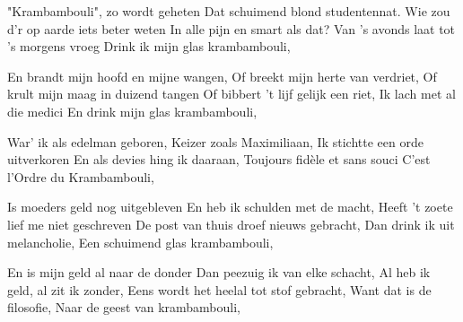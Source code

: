 \footnotemark [
ititle={Krambambouli},
tu={Crescentius Koromandel (Chanson estudiantine allemande, 1745)}]


\beginverse
"Krambambouli", zo wordt geheten
Dat schuimend blond studentennat.
Wie zou d'r op aarde iets beter weten
In alle pijn en smart als dat?
Van 's avonds laat tot 's morgens vroeg
Drink ik mijn glas krambambouli,
\endverse

\beginverse
En brandt mijn hoofd en mijne wangen,
Of breekt mijn herte van verdriet,
Of krult mijn maag in duizend tangen
Of bibbert 't lijf gelijk een riet,
Ik lach met al die medici
En drink mijn glas krambambouli,
\endverse

\beginverse
War' ik als edelman geboren,
Keizer zoals Maximiliaan,
Ik stichtte een orde uitverkoren
En als devies hing ik daaraan,
Toujours fidèle et sans souci
C'est l'Ordre du Krambambouli,
\endverse

\beginverse
Is moeders geld nog uitgebleven
En heb ik schulden met de macht,
Heeft 't zoete lief me niet geschreven
De post van thuis droef nieuws gebracht,
Dan drink ik uit melancholie,
Een schuimend glas krambambouli,
\endverse

\beginverse
En is mijn geld al naar de donder
Dan peezuig ik van elke schacht,
Al heb ik geld, al zit ik zonder,
Eens wordt het heelal tot stof gebracht,
Want dat is de filosofie,
Naar de geest van krambambouli,
\endverse
\endsong